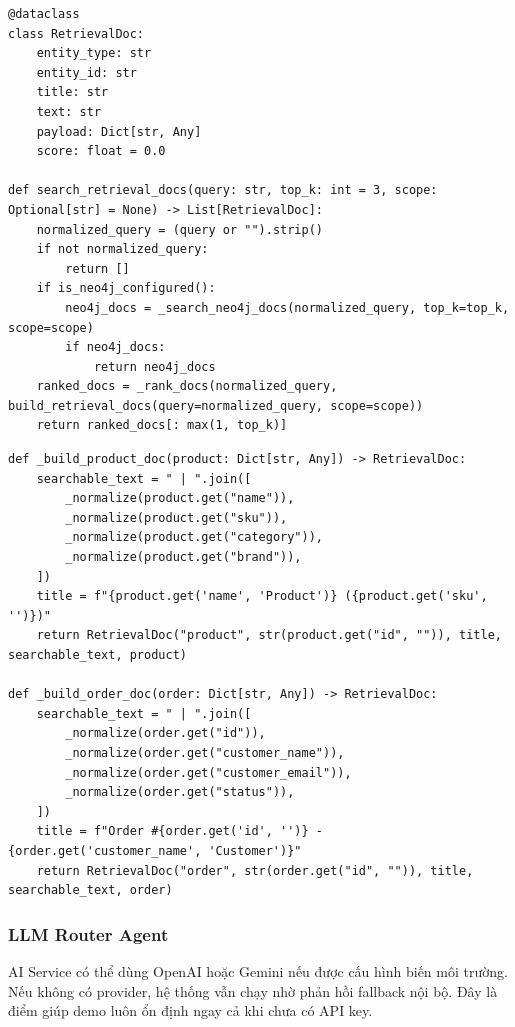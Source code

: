 \documentclass[12pt,a4paper]{article}
\begin{document}
\begin{lstlisting}[style=code,caption={Cấu trúc RetrievalDoc và hàm tìm kiếm}]
@dataclass
class RetrievalDoc:
    entity_type: str
    entity_id: str
    title: str
    text: str
    payload: Dict[str, Any]
    score: float = 0.0

def search_retrieval_docs(query: str, top_k: int = 3, scope: Optional[str] = None) -> List[RetrievalDoc]:
    normalized_query = (query or "").strip()
    if not normalized_query:
        return []
    if is_neo4j_configured():
        neo4j_docs = _search_neo4j_docs(normalized_query, top_k=top_k, scope=scope)
        if neo4j_docs:
            return neo4j_docs
    ranked_docs = _rank_docs(normalized_query, build_retrieval_docs(query=normalized_query, scope=scope))
    return ranked_docs[: max(1, top_k)]
\end{lstlisting}

\begin{lstlisting}[style=code,caption={Xây dựng tài liệu truy xuất cho product, order và user}]
def _build_product_doc(product: Dict[str, Any]) -> RetrievalDoc:
    searchable_text = " | ".join([
        _normalize(product.get("name")),
        _normalize(product.get("sku")),
        _normalize(product.get("category")),
        _normalize(product.get("brand")),
    ])
    title = f"{product.get('name', 'Product')} ({product.get('sku', '')})"
    return RetrievalDoc("product", str(product.get("id", "")), title, searchable_text, product)

def _build_order_doc(order: Dict[str, Any]) -> RetrievalDoc:
    searchable_text = " | ".join([
        _normalize(order.get("id")),
        _normalize(order.get("customer_name")),
        _normalize(order.get("customer_email")),
        _normalize(order.get("status")),
    ])
    title = f"Order #{order.get('id', '')} - {order.get('customer_name', 'Customer')}"
    return RetrievalDoc("order", str(order.get("id", "")), title, searchable_text, order)
\end{lstlisting}

\subsubsection{LLM Router Agent}
AI Service có thể dùng OpenAI hoặc Gemini nếu được cấu hình biến môi trường. Nếu không có provider, hệ thống vẫn chạy nhờ phản hồi fallback nội bộ. Đây là điểm giúp demo luôn ổn định ngay cả khi chưa có API key.
\end{document}
